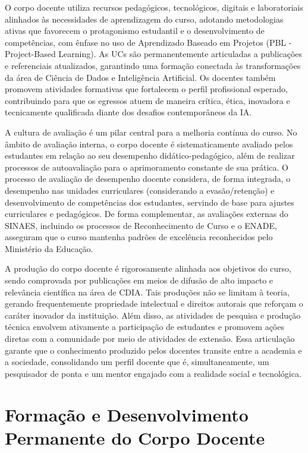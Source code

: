 O corpo docente utiliza recursos pedagógicos, tecnológicos, digitais e laboratoriais alinhados às necessidades de aprendizagem do curso, adotando metodologias ativas que favorecem o protagonismo estudantil e o desenvolvimento de competências,  com ênfase no uso de Aprendizado Baseado em Projetos (PBL - Project-Based Learning). As UCs são permanentemente articuladas a publicações e referenciais atualizados, garantindo uma formação conectada às transformações da área de Ciência de Dados e Inteligência Artificial. Os docentes também promovem atividades formativas que fortalecem o perfil profissional esperado, contribuindo para que os egressos atuem de maneira crítica, ética, inovadora e tecnicamente qualificada diante dos desafios contemporâneos da IA.

A cultura de avaliação é um pilar central para a melhoria contínua do curso. No âmbito de avaliação interna, o corpo docente é sistematicamente avaliado pelos estudantes em relação ao seu desempenho didático-pedagógico, além de realizar processos de autoavaliação para o aprimoramento constante de sua prática. O processo de avaliação de desempenho docente considera, de forma integrada, o desempenho nas unidades curriculares (considerando a evasão/retenção) e desenvolvimento de competências dos estudantes, servindo de base para ajustes curriculares e pedagógicos. De forma complementar, as avaliações externas do SINAES, incluindo os processos de Reconhecimento de Curso e o ENADE, asseguram que o curso mantenha padrões de excelência reconhecidos pelo Ministério da Educação.

A produção do corpo docente é rigorosamente alinhada aos objetivos do curso, sendo comprovada por publicações em meios de difusão de alto impacto e relevância científica na área de CDIA. Tais produções não se limitam à teoria, gerando frequentemente propriedade intelectual e direitos autorais que reforçam o caráter inovador da instituição. Além disso, as atividades de pesquisa e produção técnica envolvem ativamente a participação de estudantes e promovem ações diretas com a comunidade por meio de atividades de extensão. Essa articulação garante que o conhecimento produzido pelos docentes transite entre a academia e a sociedade, consolidando um perfil docente que é, simultaneamente, um pesquisador de ponta e um mentor engajado com a realidade social e tecnológica.

\section{Formação e Desenvolvimento Permanente do Corpo Docente}


